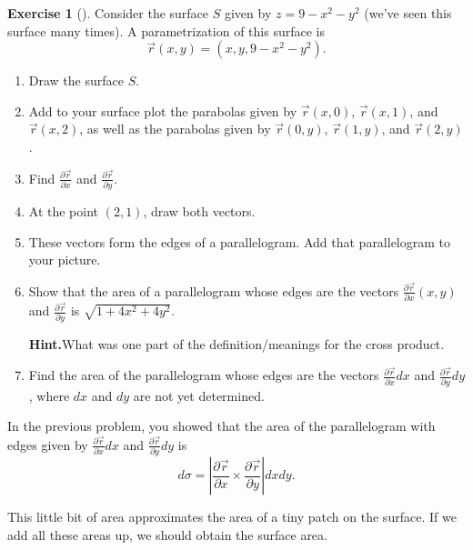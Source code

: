 \documentclass[10pt,]{book}
\theoremstyle{plain}
\theoremstyle{definition}
\theoremstyle{definition}
\theoremstyle{definition}
\theoremstyle{definition}
\newtheorem{exploration}[project]{Exercise}
\theoremstyle{definition}
\numberwithin{equation}{section}
\newcommand{\ds}{\displaystyle}
\begin{document}
\begin{exploration}[]\label{exploration-274}
Consider the surface \(S\) given by \(z=9-x^2-y^2\) (we've seen this surface many times). A parametrization of this surface is%
\begin{equation*}
\vec r(x,y) = (x,y,9-x^2-y^2).
\end{equation*}
%
\begin{enumerate}[font=\bfseries,label=(\alph*),ref=\alph*]
\item\label{task-750} Draw the surface \(S\).%
\item\label{task-751} Add to your surface plot the parabolas given by \(\vec r(x,0)\), \(\vec r(x,1)\), and \(\vec r(x,2)\), as well as the parabolas given by \(\vec r(0,y)\), \(\vec r(1,y)\), and \(\vec r(2,y)\).%
\item\label{task-752} Find \(\ds \frac{\partial \vec r}{\partial x}\) and \(\ds\frac{\partial \vec r}{\partial y}\).%
\item\label{task-753} At the point \((2,1)\), draw both vectors.%
\item\label{task-754} These vectors form the edges of a parallelogram. Add that parallelogram to your picture.%
\item\label{task-755} Show that the area of a parallelogram whose edges are the vectors \(\ds\frac{\partial \vec r}{\partial x}(x,y)\) and \(\ds\frac{\partial \vec r}{\partial y}\) is \(\sqrt{1+4x^2+4y^2}\).%
\par\medskip\noindent%
\textbf{Hint.}\quad What was one part of the definition/meanings for the cross product.%
\item\label{task-756} Find the area of the parallelogram whose edges are the vectors \(\ds\frac{\partial \vec r}{\partial x}dx\) and \(\ds\frac{\partial \vec r}{\partial y}dy\), where \(dx\) and \(dy\) are not yet determined.%
\end{enumerate}
\end{exploration}
In the previous problem, you showed that the area of the parallelogram with edges given by \(\frac{\partial \vec r}{\partial x}dx\) and \(\frac{\partial \vec r}{\partial y}dy\) is%
\begin{equation*}
d\sigma =\left |\frac{\partial \vec r}{\partial x} \times \frac{\partial \vec r}{\partial y}\right| dxdy.
\end{equation*}
%
\par
This little bit of area approximates the area of a tiny patch on the surface. If we add all these areas up, we should obtain the surface area.%
\end{document}
